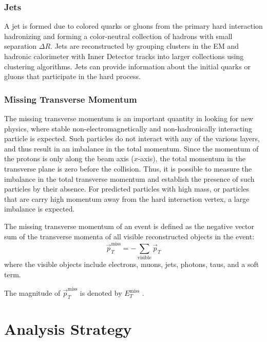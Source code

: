 \documentclass[11pt,a4paper,openright,twoside]{report}
\newcommand{\met}{$E_T^{\mathrm{miss}}$ }
\begin{document}
\subsection{Jets}
A jet is formed due to colored quarks or gluons from the primary hard interaction hadronizing and forming a color-neutral collection of hadrons with small separation $\Delta R$. Jets are reconstructed by grouping clusters in the EM and hadronic calorimeter  with Inner Detector tracks into larger collections using clustering algorithms. Jets can provide information about the initial quarks or gluons that participate in the hard process.

\subsection{Missing Transverse Momentum}
The missing transverse momentum is an important quantity in looking for new physics, where stable non-electromagnetically and non-hadronically interacting particle is expected. Such particles do not interact with any of the various layers, and thus result in an imbalance in the total momentum. Since the momentum of the protons is only along the beam axis ($x$-axis), the total momentum in the transverse plane is zero before the collision. Thus, it is possible to measure the imbalance in the total transverse momentum and establish the presence of such particles by their absence. For predicted particles with high mass, or particles that are carry high momentum away from the hard interaction vertex, a large imbalance is expected.

The missing transverse momentum of an event is defined as the negative vector sum of the transverse momenta of all visible reconstructed objects in the event:
\begin{equation}
\vec{p}_T^{\mathrm{miss}} = -\sum_{\mathrm{visible}}\vec{p}_T
\end{equation}
where the visible objects include electrons, muons, jets, photons, taus, and a soft term.

The magnitude of $\vec{p}_T^{\mathrm{miss}}$ is denoted by \met.

\chapter{Analysis Strategy}\label{ch:theory}
\end{document}
